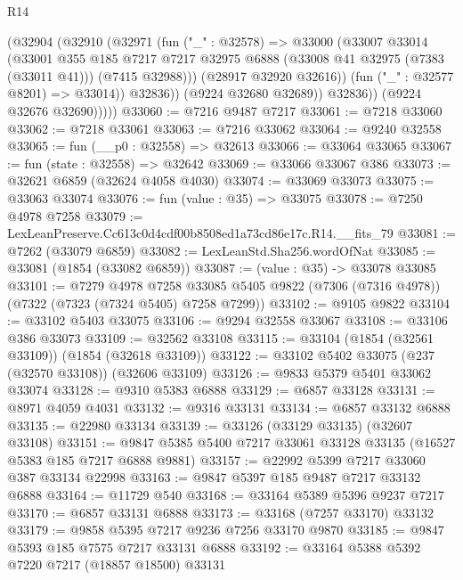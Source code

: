 \begin{lexlean}{R14}
\begin{coremodule}
                  (@32904
                    (@32910
                      (@32971
                        (fun ("_" : @32578) =>
                        @33000
                          (@33007
                            @33014
                            (@33001
                              @355
                              @185
                              @7217
                              @7217
                              @32975
                              @6888
                              (@33008 @41 @32975 (@7383 (@33011 @41)))
                              (@7415 @32988)))
                          (@28917 @32920 @32616))
                        (fun ("_" : @32577 @8201) => @33014))
                      @32836))
                  (@9224 @32680 @32689))
                @32836))
            (@9224 @32676 @32690)))))
@33060 := @7216 @9487 @7217
@33061 := @7218 @33060
@33062 := @7218 @33061
@33063 := @7216 @33062
@33064 := @9240 @32558
@33065 := fun (__p0 : @32558) => @32613
@33066 := @33064 @33065
@33067 := fun (state : @32558) => @32642
@33069 := @33066 @33067 @386
@33073 := @32621 @6859 (@32624 @4058 @4030)
@33074 := @33069 @33073
@33075 := @33063 @33074
@33076 := fun (value : @35) => @33075
@33078 := @7250 @4978 @7258
@33079 := LexLeanPreserve.Cc613c0d4cdf00b8508ed1a73cd86e17c.R14.__fits_79
@33081 := @7262 (@33079 @6859)
@33082 := LexLeanStd.Sha256.wordOfNat
@33085 := @33081 (@1854 (@33082 @6859))
@33087 := (value : @35) -> @33078 @33085
@33101 := @7279
    @4978
    @7258
    @33085
    @5405
    @9822
    (@7306 (@7316 @4978))
    (@7322 (@7323 (@7324 @5405) @7258 @7299))
@33102 := @9105 @9822
@33104 := @33102 @5403 @33075
@33106 := @9294 @32558 @33067
@33108 := @33106 @386 @33073
@33109 := @32562 @33108
@33115 := @33104 (@1854 (@32561 @33109)) (@1854 (@32618 @33109))
@33122 := @33102 @5402 @33075 (@237 (@32570 @33108)) (@32606 @33109)
@33126 := @9833 @5379 @5401 @33062 @33074
@33128 := @9310 @5383 @6888
@33129 := @6857 @33128
@33131 := @8971 @4059 @4031
@33132 := @9316 @33131
@33134 := @6857 @33132 @6888
@33135 := @22980 @33134
@33139 := @33126 (@33129 @33135) (@32607 @33108)
@33151 := @9847 @5385 @5400 @7217 @33061 @33128 @33135 (@16527 @5383 @185 @7217 @6888 @9881)
@33157 := @22992 @5399 @7217 @33060 @387 @33134 @22998
@33163 := @9847 @5397 @185 @9487 @7217 @33132 @6888
@33164 := @11729 @540
@33168 := @33164 @5389 @5396 @9237 @7217
@33170 := @6857 @33131 @6888
@33173 := @33168 (@7257 @33170) @33132
@33179 := @9858 @5395 @7217 @9236 @7256 @33170 @9870
@33185 := @9847 @5393 @185 @7575 @7217 @33131 @6888
@33192 := @33164 @5388 @5392 @7220 @7217 (@18857 @18500) @33131

\end{coremodule}
\end{lexlean}
